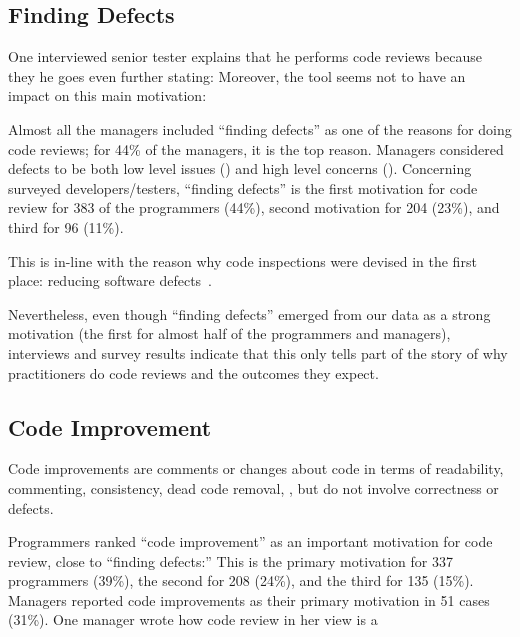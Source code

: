 \subsection{Finding Defects}

One interviewed senior tester explains that he performs code reviews because
they  he goes even further stating:
 Moreover, the tool seems not to have an impact on this main
motivation: 

Almost all the managers included ``finding defects'' as one of the reasons for
doing code reviews; for 44\% of the managers, it is the top reason. Managers
considered defects to be both low level issues (\eg {}) and high level concerns (\eg {}). Concerning surveyed developers/testers, ``finding defects'' is the
first motivation for code review for 383 of the programmers (44\%), second
motivation for 204 (23\%), and third for 96 (11\%).

This is in-line with the reason why code inspections were devised in the first
place: reducing software defects~\cite{ackerman1984software}.

Nevertheless, even though ``finding defects'' emerged from our data as a strong
motivation (the first for almost half of the programmers and managers),
interviews and survey results indicate that this only tells part of the story
of why practitioners do code reviews and the outcomes they expect.

\subsection{Code Improvement}

Code improvements are comments or changes about code in terms of readability,
commenting, consistency, dead code removal, \etc, but do not involve
correctness or defects.

Programmers ranked ``code improvement'' as an important motivation for code
review, close to ``finding defects:'' This is the primary motivation for 337
programmers (39\%), the second for 208 (24\%), and the third for 135 (15\%).
Managers reported code improvements as their primary motivation in 51 cases
(31\%). One manager wrote how code review in her view is a

